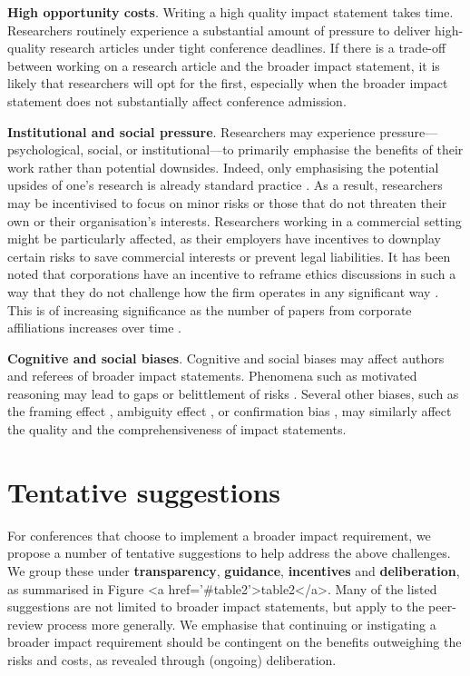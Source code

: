 \documentclass[11pt,english]{article}
\begin{document}
\textbf{High opportunity costs}. Writing a high quality impact statement takes time. Researchers routinely experience a substantial amount of pressure to deliver high-quality research articles under tight conference deadlines. If there is a trade-off between working on a research article and the broader impact statement, it is likely that researchers will opt for the first, especially when the broader impact statement does not substantially affect conference admission.

\textbf{Institutional and social pressure}. Researchers may experience pressure---psychological, social, or institutional---to primarily emphasise the benefits of their work rather than potential downsides. Indeed, only emphasising the potential upsides of one's research is already standard practice \citep{hecht_its_2018}. As a result, researchers may be incentivised to focus on minor risks or those that do not threaten their own or their organisation's interests. Researchers working in a commercial setting might be particularly affected, as their employers have incentives to downplay certain risks to save commercial interests or prevent legal liabilities. It has been noted that corporations have an incentive to reframe ethics discussions in such a way that they do not challenge how the firm operates in any significant way \citep{bietti_ethics_2020}. This is of increasing significance as the number of papers from corporate affiliations increases over time \citep{hagendorff_big_2020}. 

\textbf{Cognitive and social biases}. Cognitive and social biases may affect authors and referees of broader impact statements. Phenomena such as motivated reasoning may lead to gaps or belittlement of risks \citep{stanovich_myside_2013}. Several other biases, such as the framing effect \citep{plous_psychology_1993}, ambiguity effect \citep{curley_psychological_1986}, or confirmation bias \citep{nickerson_confirmation_1998}, may similarly affect the quality and the comprehensiveness of impact statements.



\section{Tentative suggestions}

For conferences that choose to implement a broader impact requirement, we propose a number of tentative suggestions to help address the above challenges. We group these under \textbf{transparency}, \textbf{guidance}, \textbf{incentives} and \textbf{deliberation}, as summarised in Figure <a href='#table2'>table2</a>. Many of the listed suggestions are not limited to broader impact statements, but apply to the peer-review process more generally. We emphasise that continuing or instigating a broader impact requirement should be contingent on the benefits outweighing the risks and costs, as revealed through (ongoing) deliberation.
\end{document}
